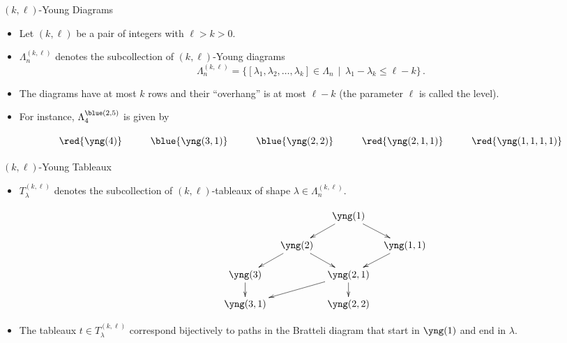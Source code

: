 \documentclass[slideColor]{prosper}
\renewcommand{\>}{\rangle}
\newcommand{\<}{\langle}
\begin{document}
\begin{slide}{$(k,\ell)$-Young Diagrams}
\vspace{-0.3cm}
\begin{itemize}
\item Let $(k,\ell)$ be a pair of integers with $\ell > k >0$.

\bigskip
\item $\Lambda_n^{(k,\ell)}$ denotes the subcollection of $(k,\ell)$-Young diagrams
\[
\Lambda_n^{(k,\ell)} = \{ [\lambda_1,\lambda_2,\ldots,\lambda_k]\in\Lambda_n \, \mid \, \lambda_1 - \lambda_k \le \ell - k\}\,.
\]

\medskip
\item The diagrams have at most $k$ rows and their ``overhang'' is at most $\ell-k$ (the parameter $\ell$ is called the level).

\bigskip
\item For instance, $\Lambda_4^{{\blue (2,5)}}$ is given by

\begin{tiny}
\[\xymatrix@R=.5cm@C=.3cm{
{\red {\yng(4)}} & & {\blue {\yng(3,1)}} & & {\blue {\yng(2,2)}} & &  {\red {\yng(2,1,1)}} & & {\red {\yng(1,1,1,1)}}
}\]
\end{tiny}

\end{itemize}

\end{slide}


\begin{slide}{$(k,\ell)$-Young Tableaux}
\vspace{-0.3cm}
\begin{itemize}
\item $T^{(k,\ell)}_\lambda$ denotes the subcollection of $(k,\ell)$-tableaux of shape $\lambda\in\Lambda_n^{(k,\ell)}$.

\vspace{-0.3cm}
\begin{tiny}
\[\xymatrix@R=.5cm@C=.3cm{
& & & & {\yng(1)} \ar[dr] \ar[dl]\\
& & & {\yng(2)} \ar[dr] \ar[dl]& &  {\yng(1,1)}\ar[dl] \\
& & {\yng(3)} \ar[d]& & {\yng(2,1)}\ar[d]\ar[dll]  \\
& & {\yng(3,1)}  & & {\yng(2,2)}
}\]
\end{tiny}

\item The tableaux $t\in T_\lambda^{(k,\ell)}$ correspond bijectively to paths in the Bratteli diagram that start in {\tiny $\yng(1)$} and end in $\lambda$.
\end{itemize}

\end{slide}
\end{document}
